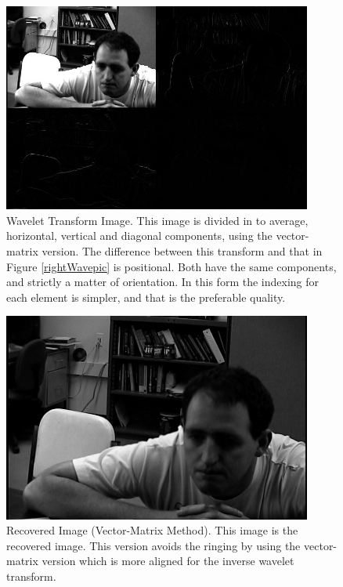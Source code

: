 \begin{figure}[htb]
\begin{center}
\includegraphics [width=4in]{selfWavepic.jpg}
\end{center}
\caption{Wavelet Transform Image.  This image is divided in to average, horizontal, vertical and diagonal components, using the vector-matrix version. The difference between this transform and that in Figure \ref{rightWavepic} is positional.  Both have the same components, and strictly a matter of orientation.  In this form the indexing for each element is simpler, and that is the preferable quality.}
\label{wavepic}
\end{figure}

\begin{figure}[htb]
\begin{center}
\includegraphics [width=4in]{selfRecover.jpg}
\end{center}
\caption{Recovered Image (Vector-Matrix Method).  This image is the recovered image.  This version avoids the ringing by using the vector-matrix version which is more aligned for the inverse wavelet transform.  }
\label{selfRecover}
\end{figure}


